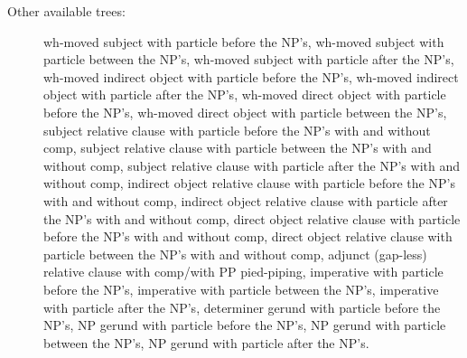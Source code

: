 \begin{description}
\item[Other available trees:] wh-moved subject with particle before the NP's,
wh-moved subject with particle between the NP's, wh-moved subject with particle
after the NP's, wh-moved indirect object with particle before the NP's,
wh-moved indirect object with particle after the NP's, wh-moved direct object
with particle before the NP's, wh-moved direct object with particle between the
NP's, subject relative clause with particle before the NP's with and without comp, 
subject relative clause with particle between the NP's with and without comp, 
subject relative clause with particle after the NP's with and without comp, 
indirect object relative clause with particle before the NP's with and without comp,
indirect object relative clause with particle after the NP's with and without comp, 
direct object relative clause with particle before the NP's with and without comp, 
direct object relative clause with particle between the NP's with and without comp, 
adjunct (gap-less) relative clause with comp/with PP pied-piping,
imperative with particle before the NP's,
imperative with particle between the NP's, imperative with particle after the
NP's, determiner gerund with particle before the NP's, NP gerund with particle
before the NP's, NP gerund with particle between the NP's, NP gerund with
particle after the NP's.

\end{description}





